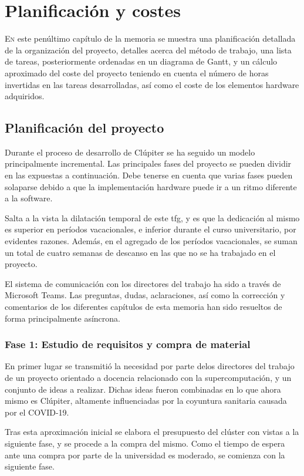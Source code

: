 \chapter{Planificación y costes}
\label{chap:planificacion_costes}

\lettrine{E}{n} este penúltimo capítulo de la memoria se muestra una planificación detallada de la organización del proyecto, detalles acerca del método de trabajo, una lista de tareas, posteriormente ordenadas en un diagrama de Gantt, y un cálculo aproximado del coste del proyecto teniendo en cuenta el número de horas invertidas en las tareas desarrolladas, así como el coste de los elementos hardware adquiridos.

\section{Planificación del proyecto}
Durante el proceso de desarrollo de Clúpiter se ha seguido un modelo principalmente incremental. Las principales fases del proyecto se pueden dividir en las expuestas a continuación. Debe tenerse en cuenta que varias fases pueden solaparse debido a que la implementación hardware puede ir a un ritmo diferente a la software.

Salta a la vista la dilatación temporal de este \acrshort{tfg}, y es que la dedicación al mismo es superior en períodos vacacionales, e inferior durante el curso universitario, por evidentes razones. Además, en el agregado de los períodos vacacionales, se suman un total de cuatro semanas de descanso en las que no se ha trabajado en el proyecto. 

El sistema de comunicación con los directores del trabajo ha sido a través de Microsoft Teams. Las preguntas, dudas, aclaraciones, así como la corrección y comentarios de los diferentes capítulos de esta memoria han sido resueltos de forma principalmente asíncrona.

\subsection{Fase 1: Estudio de requisitos y compra de material}
En primer lugar se transmitió la necesidad por parte delos directores del trabajo de un proyecto orientado a docencia relacionado con la supercomputación, y un conjunto de ideas a realizar. Dichas ideas fueron combinadas en lo que ahora mismo es Clúpiter, altamente influenciadas por la coyuntura sanitaria causada por el COVID-19.

Tras esta aproximación inicial se elabora el presupuesto del clúster con vistas a la siguiente fase, y se procede a la compra del mismo. Como el tiempo de espera ante una compra por parte de la universidad es moderado, se comienza con la siguiente fase.

